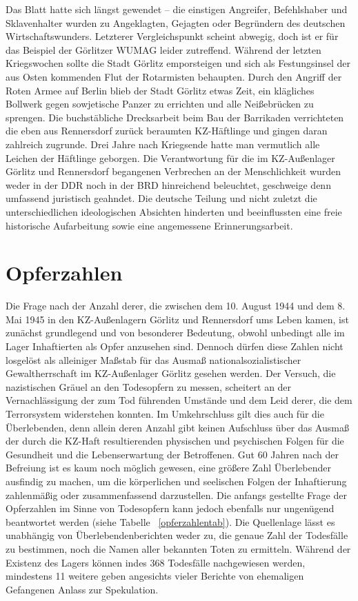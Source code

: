 
Das Blatt hatte sich längst gewendet -- die einstigen Angreifer, Befehlshaber und Sklavenhalter wurden zu Angeklagten, Gejagten oder Begründern des deutschen Wirtschaftswunders. Letzt\-er\-er Vergleichspunkt scheint abwegig, doch ist er für das Beispiel der Görlitzer WUMAG leider zutreffend.
Während der letzten Kriegswochen sollte die Stadt Görlitz emporsteigen und sich als Festungsinsel der aus Osten kommenden Flut der Rotarmisten behaupten. Durch den Angriff der Roten Armee auf Berlin blieb der Stadt Görlitz etwas Zeit, ein klägliches Bollwerk gegen sowjetische Panzer zu errichten und alle Neißebrücken zu sprengen. Die buchstäbliche Drecksarbeit beim Bau der Barrikaden verrichteten die eben aus Rennersdorf zurück beraumten KZ-Häftlinge und gingen daran zahlreich zugrunde.
Drei Jahre nach Kriegsende hatte man vermutlich alle Leichen der Häftlinge geborgen. Die Verantwortung für die im KZ-Außenlager Görlitz und Rennersdorf begangenen Verbrechen an der Menschlichkeit wurden weder in der DDR noch in der BRD hinreichend beleuchtet, geschweige denn umfassend juristisch geahndet. Die deutsche Teilung und nicht zuletzt die unterschiedlichen ideologischen Absichten hinderten und beeinflussten eine freie historische Aufarbeitung sowie eine angemessene Erinnerungsarbeit.





\section{Opferzahlen}
Die Frage nach der Anzahl derer, die zwischen dem 10. August 1944 und dem 8. Mai 1945 in den KZ-Außenlagern Görlitz und Rennersdorf ums Leben kamen, ist zunächst grundlegend und von besonderer Bedeutung, obwohl unbedingt alle im Lager Inhaftierten als Opfer anzusehen sind. 
Dennoch dürfen diese Zahlen nicht losgelöst als alleiniger Maßstab für das Ausmaß nationalsozialistischer Gewaltherrschaft im KZ-Außenlager Görlitz gesehen werden. Der Versuch, die nazistischen Gräuel an den Todesopfern zu messen, scheitert an der Vernachlässigung der zum Tod führenden Umstände und dem Leid derer, die dem Terrorsystem widerstehen konnten. 
Im Umkehrschluss gilt dies auch für die Überlebenden, denn allein deren Anzahl gibt keinen Aufschluss über das Ausmaß der durch die KZ-Haft resultierenden physischen und psychischen Folgen für die Gesundheit und die Lebenserwartung der Betroffenen.
Gut 60 Jahren nach der Befreiung ist es kaum noch möglich gewesen, eine größere Zahl Überlebender ausfindig zu machen, um die körperlichen und seelischen Folgen der Inhaftierung zahlenmäßig oder zusammenfassend darzustellen.
\newline
Die anfangs gestellte Frage der Opferzahlen im Sinne von Todesopfern kann jedoch ebenfalls nur ungenügend beantwortet werden (siehe Tabelle ~\ref{opferzahlentab}). Die Quellenlage lässt es unabhängig von Überlebendenberichten weder zu, die genaue Zahl der Todesfälle zu bestimmen, noch die Namen aller bekannten Toten zu ermitteln. Während der Existenz des Lagers können indes 368 Todesfälle nachgewiesen werden, mindestens 11 weitere geben angesichts vieler Berichte von ehemaligen Gefangenen Anlass zur Spekulation. 

